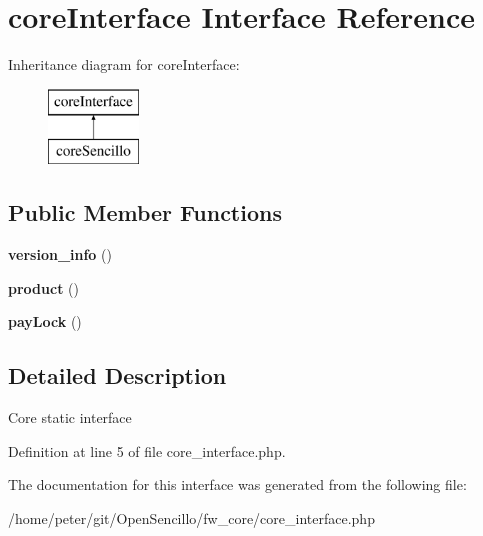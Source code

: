 \hypertarget{interfacecore_interface}{\section{core\-Interface Interface Reference}
\label{interfacecore_interface}
}
Inheritance diagram for core\-Interface\-:\begin{figure}[H]
\begin{center}
\leavevmode
\includegraphics[height=2.000000cm]{interfacecore_interface}
\end{center}
\end{figure}
\subsection*{Public Member Functions}
\begin{DoxyCompactItemize}
\item 
\hypertarget{interfacecore_interface_a7664184e15f00825b54ecf378cd4174f}{{\bfseries version\-\_\-info} ()}\label{interfacecore_interface_a7664184e15f00825b54ecf378cd4174f}

\item 
\hypertarget{interfacecore_interface_aa88fe4a9dd8795c065f2620947d450db}{{\bfseries product} ()}\label{interfacecore_interface_aa88fe4a9dd8795c065f2620947d450db}

\item 
\hypertarget{interfacecore_interface_af4cf8181fcda31ba0ce060121795c5dc}{{\bfseries pay\-Lock} ()}\label{interfacecore_interface_af4cf8181fcda31ba0ce060121795c5dc}

\end{DoxyCompactItemize}


\subsection{Detailed Description}
Core static interface 

Definition at line 5 of file core\-\_\-interface.\-php.



The documentation for this interface was generated from the following file\-:\begin{DoxyCompactItemize}
\item 
/home/peter/git/\-Open\-Sencillo/fw\-\_\-core/core\-\_\-interface.\-php\end{DoxyCompactItemize}
